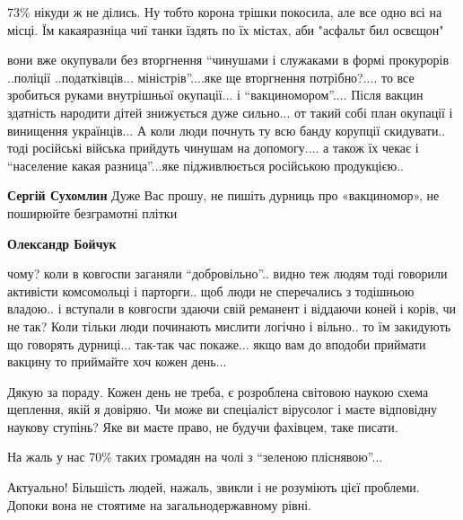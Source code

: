 \begin{itemize}

73\% нікуди ж не ділись. Ну тобто корона трішки покосила, але все одно всі на
місці. Їм какаяразніца чиї танки їздять по їх містах, аби "асфальт бил освєщон"


вони вже окупували без вторгнення \enquote{чинушами і служаками в формі прокурорів
..поліції ..податківців... міністрів}....яке ще вторгнення потрібно?.... то все
зробиться руками внутрішньої окупації... і \enquote{вакциномором}.... Після вакцин
здатність народити дітей знижується дуже сильно... от такий собі план окупації і
винищення українців... А коли люди почнуть ту всю банду корупції скидувати.. тоді
російські війська прийдуть чинушам на допомогу.... а також їх чекає і \enquote{население
какая разница}...яке підживлюється російською продукцією..  

\begin{itemize} %
\textbf{Сергій Сухомлин}
Дуже Вас прошу, не пишіть дурниць про «вакциномор», не поширюйте безграмотні плітки

\textbf{Олександр Бойчук} 

чому? коли в ковгоспи заганяли \enquote{добровільно}.. видно теж людям тоді говорили
активісти комсомольці і парторги.. щоб люди не сперечались з тодішньою владою.. і
вступали в ковгоспи здаючи свій реманент і віддаючи коней і корів, чи не так?
Коли тільки люди починають мислити логічно і вільно.. то їм закидують що
говорять дурниці... так-так час покаже... якщо вам до вподоби приймати вакцину то
приймайте хоч кожен день...


Дякую за пораду. Кожен день не треба, є розроблена світовою наукою схема
щеплення, якій я довіряю. Чи може ви спеціаліст вірусолог і маєте відповідну
наукову ступінь? Яке ви маєте право, не будучи фахівцем, таке писати.

\end{itemize} %


На жаль у нас 70\% таких громадян на чолі з \enquote{зеленою пліснявою}...


Актуально! Більшість людей, нажаль, звикли і не розуміють цієї проблеми. Допоки
вона не стоятиме на загальнодержавному рівні.



\end{itemize}

